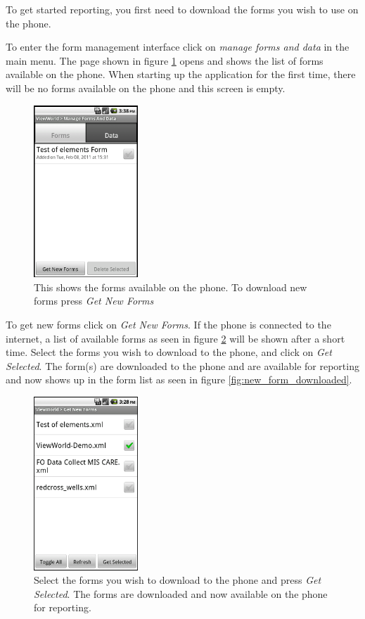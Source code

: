 \documentclass[a4paper, 12pt, final]{article}
\begin{document}
To get started reporting, you first need to download the forms you wish to use on the phone.

To enter the form management interface click on \emph{manage forms and data} in the main menu. The page shown in figure \ref{fig:manage_forms_and_data} opens and shows the list of forms available on the phone. When starting up the application for the first time, there will be no forms available on the phone and this screen is empty.

\begin{figure}[h!]
  \centering
      \includegraphics[width=0.35\textwidth]{pics/manage_forms_and_data.png}
  \caption{This shows the forms available on the phone. To download new forms press \emph{Get New Forms}}
  \label{fig:manage_forms_and_data}
\end{figure}

To get new forms click on \emph{Get New Forms}. If the phone is connected to the internet, a list of available forms as seen in figure \ref{fig:get_new_forms} will be shown after a short time. Select the forms you wish to download to the phone, and click on \emph{Get Selected}. The form(s) are downloaded to the phone and are available for reporting and now shows up in the form list as seen in figure \ref{fig:new_form_downloaded}.

\begin{figure}[h!]
  \centering
      \includegraphics[width=0.35\textwidth]{pics/get_new_forms.png}
  \caption{Select the forms you wish to download to the phone and press \emph{Get Selected}. The forms are downloaded and now available on the phone for reporting.}
  \label{fig:get_new_forms}
\end{figure}
\end{document}
